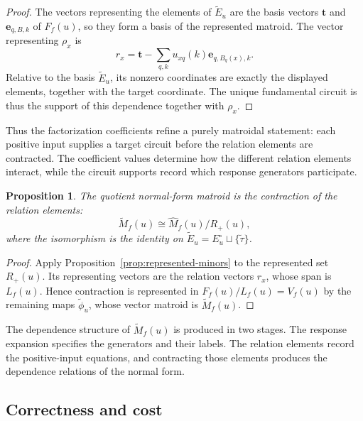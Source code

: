 \documentclass[11pt]{article}
\numberwithin{equation}{section}
\newtheorem{proposition}[definition]{Proposition}
\theoremstyle{remark}
\begin{document}
\begin{proof}
The vectors representing the elements of $\widetilde E_u$ are the
basis vectors $\mathbf t$ and $\mathbf e_{q,B,k}$ of $F_f(u)$, so they form
a basis of the represented matroid. The vector representing $\rho_x$ is
\begin{equation}
    r_x
    =
    \mathbf t-
    \sum_{q,k}u_{xq}(k)\mathbf e_{q,B_q(x),k}.
\end{equation}
Relative to the basis $\widetilde E_u$, its nonzero coordinates are exactly
the displayed elements, together with the target coordinate. The unique
fundamental circuit is thus the support of this dependence together
with $\rho_x$.
\end{proof}

Thus the factorization coefficients refine a purely matroidal statement:
each positive input supplies a target circuit before the relation elements
are contracted. The coefficient values determine how the different relation
elements interact, while the circuit supports record which response
generators participate.

\begin{proposition}
\label{prop:quotient-normal-form-contraction}
The quotient normal-form matroid is the contraction of the relation elements:
\begin{equation}
    \widetilde M_f(u)
    \cong
    \widehat M_f(u)/R_+(u),
\end{equation}
where the isomorphism is the identity on
$\widetilde E_u=E_u^\circ\sqcup\{\widetilde\tau\}$.
\end{proposition}

\begin{proof}
Apply Proposition~\ref{prop:represented-minors} to the represented set
$R_+(u)$. Its representing vectors are the relation vectors $r_x$,
whose span is $L_f(u)$. Hence contraction is represented in
$F_f(u)/L_f(u)=V_f(u)$ by the remaining maps $\widetilde\phi_u$, whose
vector matroid is $\widetilde M_f(u)$.
\end{proof}

The dependence structure of $\widetilde M_f(u)$ is produced in
two stages. The response expansion specifies the generators and their
labels. The relation elements record the positive-input equations, and
contracting those elements produces the dependence relations of the normal
form.

\subsection{Correctness and cost}
\label{subsec:quotient-normal-form-correctness}
\end{document}
